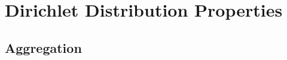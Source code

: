\documentclass[12pt]{report}
\DeclareMathOperator{\Prm}{\mathrm{P}}
\DeclareMathOperator{\Ycal}{\mathcal{Y}}
\DeclareMathOperator{\Zcal}{\mathcal{Z}}
\DeclareMathOperator{\Mcal}{\mathcal{M}}
\DeclareMathOperator{\Scal}{\mathcal{S}}
\DeclareMathOperator{\Pcal}{\mathcal{P}}
\DeclareMathOperator{\Multi}{\mathrm{Multi}}
\DeclareMathOperator{\thetam}{\theta_\text{m}}
\DeclareMathOperator{\thetac}{\theta_\text{c}}
\DeclareMathOperator{\psim}{\psi_\text{m}}
\DeclareMathOperator{\uppsim}{\uppsi_\text{m}}
\begin{document}
%
%
%
%
%









\section{Dirichlet Distribution Properties}
\label{app:Dir_agg}


\subsection{Aggregation}
\end{document}
